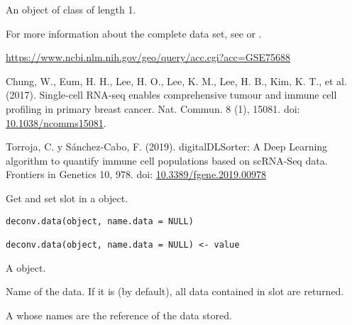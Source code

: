 \documentclass[a4paper]{book}
\begin{document}
%
\begin{Format}
An object of class  of length 1.
\end{Format}
%
\begin{Details}\relax
For more information about the complete data set, see
 or .
\end{Details}
%
\begin{Source}\relax
\url{https://www.ncbi.nlm.nih.gov/geo/query/acc.cgi?acc=GSE75688}
\end{Source}
%
\begin{References}\relax
Chung, W., Eum, H. H., Lee, H. O., Lee, K. M., Lee, H. B., Kim,
K. T., et al. (2017). Single-cell RNA-seq enables comprehensive tumour and
immune cell profiling in primary breast cancer. Nat. Commun. 8 (1), 15081.
doi: \url{10.1038/ncomms15081}.

Torroja, C. y Sánchez-Cabo, F. (2019). digitalDLSorter: A Deep Learning
algorithm to quantify immune cell populations based on scRNA-Seq data.
Frontiers in Genetics 10, 978. doi: \url{10.3389/fgene.2019.00978}
\end{References}
%
\begin{Description}\relax
Get and set  slot in a 
object.
\end{Description}
%
\begin{Usage}
\begin{verbatim}
deconv.data(object, name.data = NULL)

deconv.data(object, name.data = NULL) <- value
\end{verbatim}
\end{Usage}
%
\begin{Arguments}
\begin{ldescription}
\item[\code{object}] A  object.

\item[\code{name.data}] Name of the data. If it is  (by default),
all data contained in  slot are returned.

\item[\code{value}] A  whose names are the reference of the data stored.
\end{ldescription}
\end{Arguments}
\end{document}

